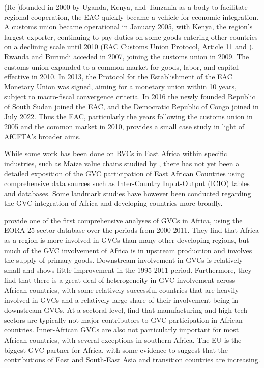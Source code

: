 \documentclass[a4paper]{article}
\begin{document}
(Re-)founded in 2000 by Uganda, Kenya, and Tanzania as a body to facilitate regional cooperation, the EAC quickly became a vehicle for economic integration. A customs union became operational in January 2005, with Kenya, the region's largest exporter, continuing to pay duties on some goods entering other countries on a declining scale until 2010 (EAC Customs Union Protocol, Article 11 and \citet{aloo2017free}). Rwanda and Burundi acceded in 2007, joining the customs union in 2009. The customs union expanded to a common market for goods, labor, and capital effective in 2010. In 2013, the Protocol for the Establishment of the EAC Monetary Union was signed, aiming for a monetary union within 10 years, subject to macro-fiscal convergence criteria. In 2016 the newly founded Republic of South Sudan joined the EAC, and the Democratic Republic of Congo joined in July 2022. Thus the EAC, particularly the years following the customs union in 2005 and the common market in 2010, provides a small case study in light of AfCFTA's broader aims. \newline 

While some work has been done on RVCs in East Africa within specific industries, such as Maize value chains studied by \citet{daly2016maize}, there has not yet been a detailed exposition of the GVC participation of East African Countries using comprehensive data sources such as Inter-Country Input-Output (ICIO) tables and databases. Some landmark studies have however been conducted regarding the GVC integration of Africa and developing countries more broadly. \newline

\citet{foster2015global} provide one of the first comprehensive analyses of GVCs in Africa, using the EORA 25 sector database over the periods from 2000-2011. They find that Africa as a region is more involved in GVCs than many other developing regions, but much of the GVC involvement of Africa is in upstream production and involves the supply of primary goods. Downstream involvement in GVCs is relatively small and shows little improvement in the 1995-2011 period. Furthermore, they find that there is a great deal of heterogeneity in GVC involvement across African countries, with some relatively successful countries that are heavily involved in GVCs and a relatively large share of their involvement being in downstream GVCs. At a sectoral level, \citet{foster2015global} find that manufacturing and high-tech sectors are typically not major contributors to GVC participation in African countries. Inner-African GVCs are also not particularly important for most African countries, with several exceptions in southern Africa. The EU is the biggest GVC partner for Africa, with some evidence to suggest that the contributions of East and South-East Asia and transition countries are increasing. \newline
\end{document}

